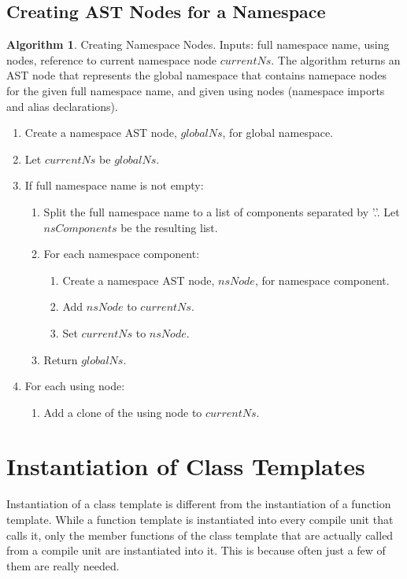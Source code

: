 \documentclass[a4paper,oneside,11pt]{book}
\theoremstyle{definition}
\newtheorem{algo}{Algorithm}[section]
\begin{document}
\subsection{Creating AST Nodes for a Namespace}

\begin{algo}\label{creatingns} Creating Namespace Nodes. Inputs: full namespace name, using nodes, reference to current namespace node $currentNs$.
The algorithm returns an AST node that represents the global namespace that contains namepace nodes for the given full namespace name,
and given using nodes (namespace imports and alias declarations).
\begin{enumerate}
\item
Create a namespace AST node, $globalNs$, for global namespace.
\item
Let $currentNs$ be $globalNs$.
\item
If full namespace name is not empty:
\begin{enumerate}
\item
Split the full namespace name to a list of components separated by '.'. Let $nsComponents$ be the resulting list.
\item
For each namespace component:
\begin{enumerate}
\item
Create a namespace AST node, $nsNode$, for namespace component.
\item
Add $nsNode$ to $currentNs$.
\item
Set $currentNs$ to $nsNode$.
\end{enumerate}
\item
Return $globalNs$.
\end{enumerate}
\item
For each using node:
\begin{enumerate}
\item
Add a clone of the using node to $currentNs$.
\end{enumerate}
\end{enumerate}
\end{algo}

\section{Instantiation of Class Templates}

Instantiation of a class template is different from the instantiation of a function template.
While a function template is instantiated into every compile unit that calls it, only the member functions of the class template that are
actually called from a compile unit are instantiated into it. This is because often just a few of them are really needed.
\end{document}
